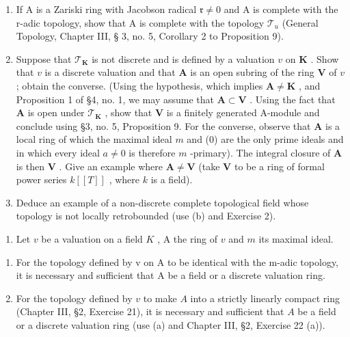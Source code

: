 \begin{enumerate}
\def\labelenumi{(\alph{enumi})}
\item
  If A is a Zariski ring with Jacobson radical \(\mathfrak{r} \neq 0\) and A is complete with the r-adic topology, show that A is complete with the topology \(\mathcal{T}_u\) (General Topology, Chapter III, § 3, no. 5, Corollary 2 to Proposition 9).
\item
  Suppose that \(\mathcal{T}_{\mathbf{K}}\) is not discrete and is defined by a valuation \(v\) on \(\mathbf{K}\) . Show that \(v\) is a discrete valuation and that \(\mathbf{A}\) is an open subring of the ring \(\mathbf{V}\) of \(v\) ; obtain the converse. (Using the hypothesis, which implies \(\mathbf{A} \neq \mathbf{K}\) , and Proposition 1 of §4, no. 1, we may assume that \(\mathbf{A} \subset \mathbf{V}\) . Using the fact that \(\mathbf{A}\) is open under \(\mathcal{T}_{\mathbf{K}}\) , show that \(\mathbf{V}\) is a finitely generated A-module and conclude using §3, no. 5, Proposition 9. For the converse, observe that \(\mathbf{A}\) is a local ring of which the maximal ideal \(m\) and (0) are the only prime ideals and in which every ideal \(a \neq 0\) is therefore \(m\) -primary). The integral closure of \(\mathbf{A}\) is then \(\mathbf{V}\) . Give an example where \(\mathbf{A} \neq \mathbf{V}\) (take \(\mathbf{V}\) to be a ring of formal power series \(k[[T]]\) , where \(k\) is a field).
\item
  Deduce an example of a non-discrete complete topological field whose topology is not locally retrobounded (use (b) and Exercise 2).
\end{enumerate}

\begin{enumerate}
\def\labelenumi{\arabic{enumi}.}
\setcounter{enumi}{3}
\tightlist
\item
  Let \(v\) be a valuation on a field \(K\) , A the ring of \(v\) and \(m\) its maximal ideal.
\end{enumerate}

\begin{enumerate}
\def\labelenumi{(\alph{enumi})}
\item
  For the topology defined by v on A to be identical with the m-adic topology, it is necessary and sufficient that A be a field or a discrete valuation ring.
\item
  For the topology defined by \(v\) to make \(A\) into a strictly linearly compact ring (Chapter III, §2, Exercise 21), it is necessary and sufficient that \(A\) be a field or a discrete valuation ring (use (a) and Chapter III, §2, Exercise 22 (a)).
\end{enumerate}

